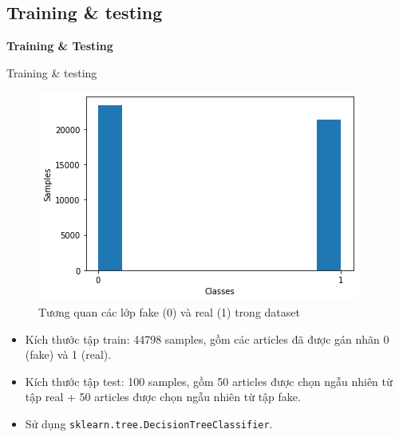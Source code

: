 \documentclass[aspectratio=169,xcolor=dvipsnames]{beamer}
\begin{document}
\subsection{Training \& testing}

\begin{frame}
	\Huge{\centerline{\textbf{Training \& Testing}}}
\end{frame}

\begin{frame}{Training \& testing}
\begin{figure}[H]
	\centering
	\includegraphics[scale=.4]{img/data-summerise.png}
	\caption{Tương quan các lớp fake (0) và real (1) trong dataset}
\end{figure}
\begin{itemize}
\item Kích thước tập train: 44798 samples, gồm các articles đã được gán nhãn 0 (fake) và 1 (real).
\item Kích thước tập test: 100 samples, gồm 50 articles được chọn ngẫu nhiên từ tập real + 50 articles được chọn ngẫu nhiên từ tập fake.
\item Sử dụng \texttt{sklearn.tree.DecisionTreeClassifier}.
\end{itemize}
\end{frame}
\end{document}

